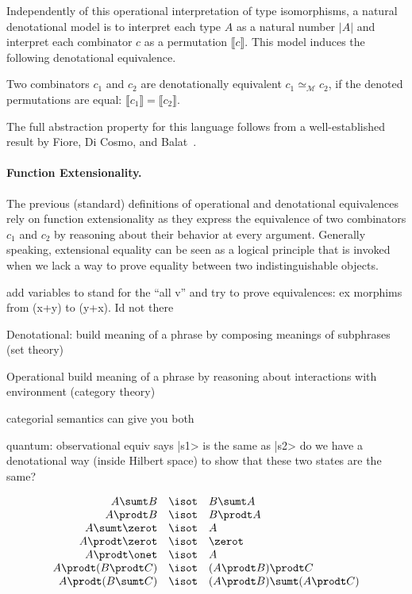 Independently of this operational interpretation of type isomorphisms, a natural
denotational model is to interpret each type $A$ as a natural number $|A|$ and
interpret each combinator $c$ as a permutation $\llbracket c \rrbracket$. This
model induces the following denotational equivalence.

\begin{definition}
  Two combinators $c_1$ and $c_2$ are denotationally equivalent
  $c_1 \simeq_{\mathcal{M}} c_2$, if the denoted permutations are equal:
  $\llbracket c_1 \rrbracket = \llbracket c_2 \rrbracket$.
\end{definition}

The full abstraction property for this language follows from a well-established
result by Fiore, Di Cosmo, and Balat~\cite{fioreRemarksIsomorphismsTyped2002}.

\paragraph*{Function Extensionality.} The previous (standard) definitions of
operational and denotational equivalences rely on function extensionality as
they express the equivalence of two combinators $c_1$ and $c_2$ by reasoning
about their behavior at every argument. Generally speaking, extensional equality
can be seen as a logical principle that is invoked when we lack a way to prove
equality between two indistinguishable objects.

add variables to stand for the ``all v'' and try to prove equivalences: ex
morphims from (x+y) to (y+x). Id not there

Denotational: build meaning of a phrase by composing meanings of subphrases (set theory)

Operational build meaning of a phrase by reasoning about interactions with
environment (category theory)

categorial semantics can give you both

quantum: observational equiv says |s1> is the same as |s2>
do we have a denotational way (inside Hilbert space) to show that these two
states are the same?

\[\begin{array}{rcl}
    A \sumt B &\isot& B \sumt A \\
    A \prodt B &\isot& B \prodt A \\
    A \sumt \zerot &\isot& A \\
    A \prodt \zerot &\isot& \zerot \\
    A \prodt \onet &\isot& A \\
    A \prodt (B \prodt C) &\isot& (A \prodt B) \prodt C \\
    A \prodt (B \sumt C) &\isot& (A \prodt B) \sumt (A \prodt C)
  \end{array}\]

